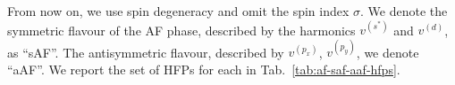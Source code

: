 From now on, we use spin degeneracy and omit the spin index $\sigma$. We denote the symmetric flavour of the AF phase, described by the harmonics $v^{(s^*)}$ and $v^{(d)}$, as ``sAF''. The antisymmetric flavour, described by $v^{(p_x)}$, $v^{(p_y)}$, we denote ``aAF''. We report the set of HFPs for each in Tab.~\ref{tab:af-saf-aaf-hfps}.

%
%
%
